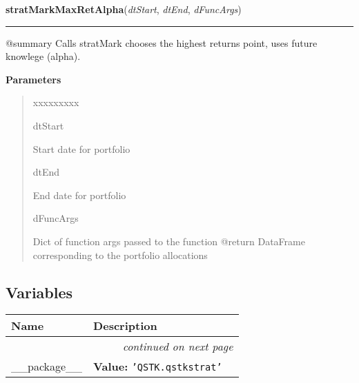 \hspace{.8\funcindent}\begin{boxedminipage}{\funcwidth}

    \raggedright \textbf{stratMarkMaxRetAlpha}(\textit{dtStart}, \textit{dtEnd}, \textit{dFuncArgs})

    \vspace{-1.5ex}

    \rule{\textwidth}{0.5\fboxrule}
\setlength{\parskip}{2ex}
    @summary Calls stratMark chooses the highest returns point, uses future
    knowlege (alpha).

\setlength{\parskip}{1ex}
      \textbf{Parameters}
      \vspace{-1ex}

      \begin{quote}
        \begin{Ventry}{xxxxxxxxx}

          \item[dtStart]

          Start date for portfolio

          \item[dtEnd]

          End date for portfolio

          \item[dFuncArgs]

          Dict of function args passed to the function @return DataFrame 
          corresponding to the portfolio allocations

        \end{Ventry}

      \end{quote}

    \end{boxedminipage}



  \subsection{Variables}

    \vspace{-1cm}
\hspace{\varindent}\begin{longtable}{|p{\varnamewidth}|p{\vardescrwidth}|l}
\cline{1-2}
\cline{1-2} \centering \textbf{Name} & \centering \textbf{Description}& \\
\cline{1-2}
\endhead\cline{1-2}\multicolumn{3}{r}{\small\textit{continued on next page}}\\\endfoot\cline{1-2}
\endlastfoot\raggedright \_\-\_\-p\-a\-c\-k\-a\-g\-e\-\_\-\_\- & \raggedright \textbf{Value:} 
{\tt \texttt{'}\texttt{QSTK.qstkstrat}\texttt{'}}&\\
\cline{1-2}
\end{longtable}

